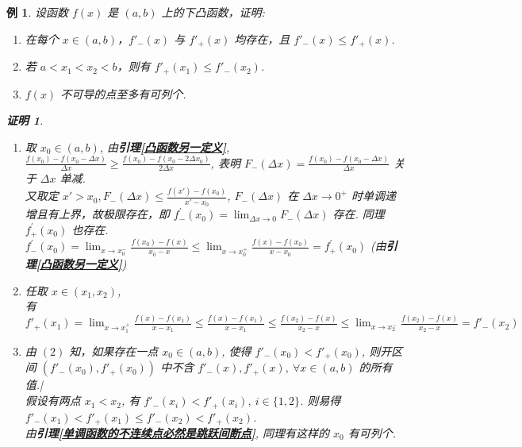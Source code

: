 \documentclass{ctexart}
\newcommand{\。}{．} %
\newcommand{\ds}{^\prime}
\newenvironment{zise}{
    \begin{tcolorbox}[enhanced, breakable, colback=qzi, boxrule=0pt, frame hidden,
        borderline west={0.7mm}{0.1mm}{szi}]
    }
    {\end{tcolorbox}}
\theoremstyle{t} %
\newtheorem{lthj}{\color{szi} 例}[subsection]
\newtheorem*{zmhj}{\color{slan} 证明}
\newenvironment{lt}{\begin{zise}\begin{lthj}}{\end{lthj}\end{zise}}
\begin{document}
\begin{lt}
    设函数 $f(x)$ 是 $(a, b)$ 上的下凸函数，证明:
    \begin{enumerate}
        \item [(1)] 在每个 $x \in (a, b)$，$f'_-(x)$ 与 $f'_+(x)$ 均存在，且 $f'_-(x) \leqslant f'_+(x)$.
        \item [(2)] 若 $a < x_1 < x_2 < b$，则有 $f'_+(x_1) \leqslant f'_-(x_2)$.
        \item [(3)] $f(x)$ 不可导的点至多有可列个.
    \end{enumerate}
    \begin{zmhj} \quad
        \begin{enumerate}
            \item [(1)] 取 $x_0 \in (a, b)$, 由\textbf{引理\ref{凸函数另一定义}}, $\frac{f(x_0) - f(x_0 - \Delta x)}{\Delta x} \geqslant \frac{f(x_0) - f(x_0 - 2 \Delta x_0)}{2\Delta x}$, 表明 $F_-(\Delta x) = \frac{f(x_0) - f(x_0 - \Delta x)}{\Delta x}$ 关于 $\Delta x$ 单减. \\
            又取定 $x' > x_0, F_-(\Delta x) \leqslant \frac{f(x') - f(x_0)}{x' - x_0}$, $F_-(\Delta x)$ 在 $\Delta x \to 0^+$ 时单调递增且有上界，故极限存在，即 $f\ds_-(x_0) = \lim_{\Delta x \to 0}F_-(\Delta x)$ 存在. 同理 $f\ds_+(x_0)$ 也存在.\\
            $f\ds_-(x_0) = \lim_{x \to x_0^-}\frac{f(x_0) - f(x)}{x_0 - x} \leqslant \lim_{x \to x_0^+}\frac{f(x) - f(x_0)}{x - x_0} = f\ds_+(x_0)$ \quad(由\textbf{引理\ref{凸函数另一定义}}) 
            \item [(2)] 任取 $x \in (x_1, x_2)$, \\
            有 $f'_+(x_1) = \lim_{x \to x_1^+}\frac{f(x) - f(x_1)}{x - x_1} \leqslant \frac{f(x) - f(x_1)}{x - x_1} \leqslant \frac{f(x_2) - f(x)}{x_2 - x} \leqslant \lim_{x \to x_2^-}\frac{f(x_2) - f(x)}{x_2 - x} = f'_-(x_2)$
            \item [(3)] 由 $(2)$ 知，如果存在一点 $x_0 \in (a, b)$, 使得 $f'_-(x_0) < f'_+(x_0)$, 则开区间 $(f'_-(x_0), f'_+(x_0))$ 中不含 $f'_-(x), f'_+(x), \ \forall x \in (a, b)$ 的所有值.|\\
            假设有两点 $x_1 < x_2$, 有 $f'_-(x_i) < f'_+(x_i), \ i \in \{1, 2\}$. 则易得 $f'_-(x_1) < f'_+(x_1) \leqslant f'_-(x_2) < f'_+(x_2)$. \\
            由\textbf{引理\ref{单调函数的不连续点必然是跳跃间断点}}, 同理有这样的 $x_0$ 有可列个. 
        \end{enumerate}
    \end{zmhj}
\end{lt}
\end{document}

